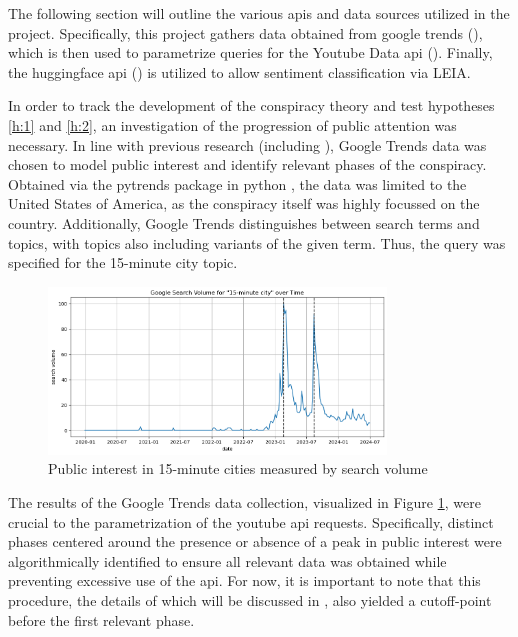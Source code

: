 \documentclass[fontsize=11pt, parskip=half]{scrartcl}
\begin{document}
    The following section will outline the various apis and data sources utilized in the project. Specifically, this project gathers data obtained from google trends (\citeyear{google15minuteCity2024}), which is then used to parametrize queries for the Youtube Data api (\citeyear{googlefordevelopersYoutubeDataApi2024}). Finally, the huggingface api (\citeyear{huggingfaceTransformers2024}) is utilized to allow sentiment classification via LEIA.

    In order to track the development of the conspiracy theory and test hypotheses \ref{h:1} and \ref{h:2}, an investigation of the progression of public attention was necessary. In line with previous research (including \cite{mavraganiAssessingMethodsTools2018,yeoPublicAttentionLocal2019,junTenYearsResearch2018a}), Google Trends data was chosen to model public interest and identify relevant phases of the conspiracy. Obtained via the pytrends package \parencite{dreyco676Pytrends2023} in python \parencite{vanrossumPythonReferenceManual2009}, the data was limited to the United States of America, as the conspiracy itself was highly focussed on the country. Additionally, Google Trends distinguishes between search terms and topics, with topics also including variants of the given term. Thus, the query was specified for the 15-minute city topic.

    \begin{figure}{}
        \centering
        \setlength\intextsep{0pt}
        \includegraphics[width=0.8\textwidth]{img/gtrends_2-peak.png}
        \vspace{-5pt}
        \caption{Public interest in 15-minute cities measured by search volume}
        \vspace{-10pt}
        \label{fig:gtrends_raw}
    \end{figure}

    The results of the Google Trends data collection, visualized in Figure \ref{fig:gtrends_raw}, were crucial to the parametrization of the youtube api requests. Specifically, distinct phases centered around the presence or absence of a peak in public interest were algorithmically identified to ensure all relevant data was obtained while preventing excessive use of the api. For now, it is important to note that this procedure, the details of which will be discussed in , also yielded a cutoff-point before the first relevant phase.
\end{document}
